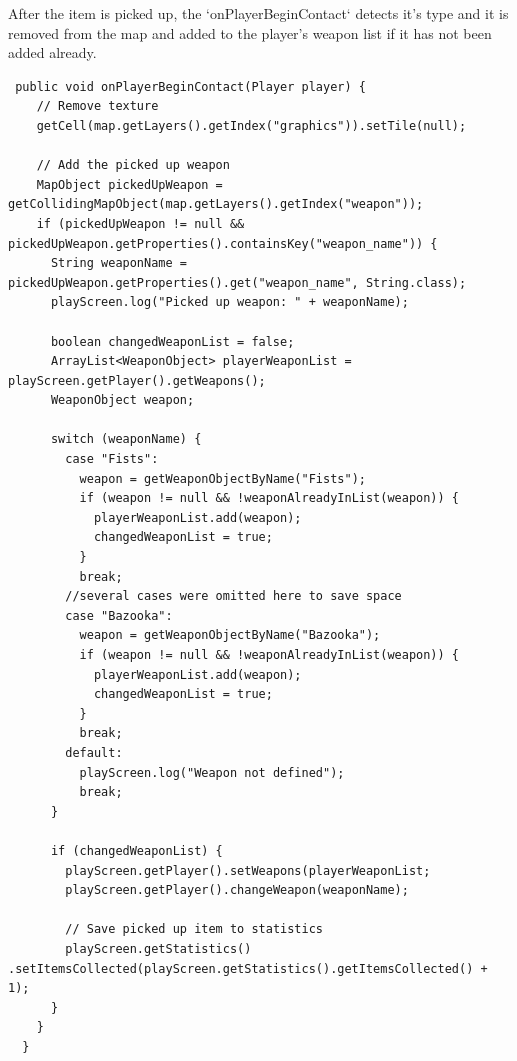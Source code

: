 \documentclass[12p]{article}
\begin{document}
After the item is picked up, the `onPlayerBeginContact` detects it's type and it is removed from the map and added to the player's weapon list if it has not been added already.

\begin{verbatim}
 public void onPlayerBeginContact(Player player) {
    // Remove texture
    getCell(map.getLayers().getIndex("graphics")).setTile(null);

    // Add the picked up weapon
    MapObject pickedUpWeapon = getCollidingMapObject(map.getLayers().getIndex("weapon"));
    if (pickedUpWeapon != null && pickedUpWeapon.getProperties().containsKey("weapon_name")) {
      String weaponName = pickedUpWeapon.getProperties().get("weapon_name", String.class);
      playScreen.log("Picked up weapon: " + weaponName);

      boolean changedWeaponList = false;
      ArrayList<WeaponObject> playerWeaponList = playScreen.getPlayer().getWeapons();
      WeaponObject weapon;
      
      switch (weaponName) {
        case "Fists":
          weapon = getWeaponObjectByName("Fists");
          if (weapon != null && !weaponAlreadyInList(weapon)) {
            playerWeaponList.add(weapon);
            changedWeaponList = true;
          }
          break;
        //several cases were omitted here to save space
        case "Bazooka":
          weapon = getWeaponObjectByName("Bazooka");
          if (weapon != null && !weaponAlreadyInList(weapon)) {
            playerWeaponList.add(weapon);
            changedWeaponList = true;
          }
          break;
        default:
          playScreen.log("Weapon not defined");
          break;
      }

      if (changedWeaponList) {
        playScreen.getPlayer().setWeapons(playerWeaponList;
        playScreen.getPlayer().changeWeapon(weaponName);

        // Save picked up item to statistics
        playScreen.getStatistics() .setItemsCollected(playScreen.getStatistics().getItemsCollected() + 1);
      }
    }
  }
\end{verbatim}
 
\end{document}
